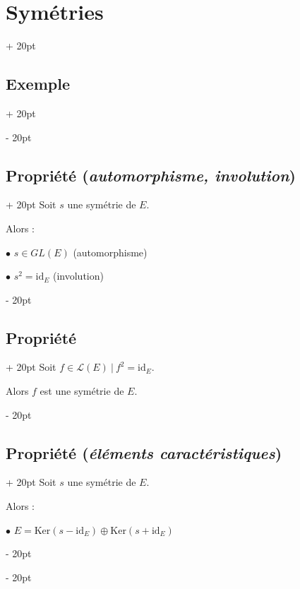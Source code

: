 \documentclass[a4paper, 12pt, twoside]{article}
\newcommand{\ind}[1][20pt]{\advance\leftskip + #1}
\newcommand{\deind}[1][20pt]{\advance\leftskip - #1}
\newenvironment{indt}[2][20pt]{#2 \par \ind[#1]}{\par \deind} %
\begin{document}
\begin{indt}{\section{Symétries}}
\begin{indt}{\subsection{Exemple}}
\begin{center}
            \end{center}
        \end{indt}

        \vspace{12pt}
        
        \begin{indt}{\subsection{Propriété (\textit{automorphisme, involution})}}
            Soit $s$ une symétrie de $E$.

            Alors :

            $\bullet$ $s \in GL(E)$ (automorphisme)

            $\bullet$ $s^2 = \mathrm{id}_E$ (involution)
        \end{indt}

        \vspace{12pt}
        
        \begin{indt}{\subsection{Propriété}}
            Soit $f \in \mathcal L(E)\ |\ f^2 = \mathrm{id}_E$.

            Alors $f$ est une symétrie de $E$.
        \end{indt}

        \vspace{12pt}
        
        \begin{indt}{\subsection{Propriété (\textit{éléments caractéristiques})}}
            Soit $s$ une symétrie de $E$.

            Alors :

            $\bullet$ $E = \mathrm{Ker}(s - \mathrm{id}_E) \oplus \mathrm{Ker}(s + \mathrm{id}_E)$


\end{indt}
\end{indt}
\end{document}

